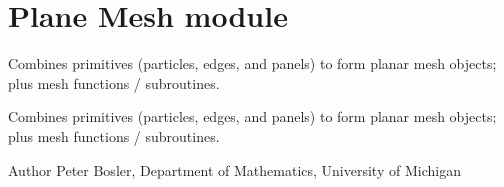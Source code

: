 \hypertarget{group__PlaneMesh}{\section{Plane Mesh module}
\label{group__PlaneMesh}
}


Combines primitives (particles, edges, and panels) to form planar mesh objects; plus mesh functions / subroutines.  


Combines primitives (particles, edges, and panels) to form planar mesh objects; plus mesh functions / subroutines. 

\begin{DoxyAuthor}{Author}
Peter Bosler, Department of Mathematics, University of Michigan 
\end{DoxyAuthor}
